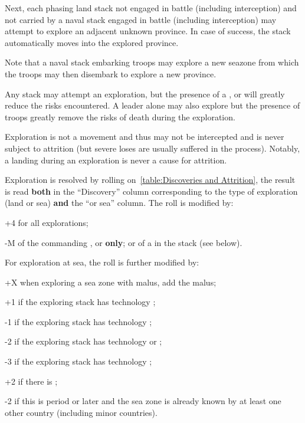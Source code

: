 Next, each phasing land stack not engaged in battle (including interception)
and not carried by a naval stack engaged in battle (including interception)
may attempt to explore an adjacent unknown province. In case of success, the
stack automatically moves into the explored province.

Note that a naval stack embarking troops may explore a new seazone from which
the troops may then disembark to explore a new province.

Any stack may attempt an exploration, but the presence of a \LeaderE, \LeaderC
or \LeaderGov will greatly reduce the risks encountered. A leader alone may
also explore but the presence of troops greatly remove the risks of death
during the exploration.

Exploration is not a movement and thus may not be intercepted and is never
subject to attrition (but severe loses are usually suffered in the
process). Notably, a landing during an exploration is never a cause for
attrition.

Exploration is resolved by rolling on~\ref{table:Discoveries and Attrition},
the result is read \textbf{both} in the ``Discovery'' column corresponding to
the type of exploration (land or sea) \textbf{and} the ``\ROTW or sea''
column. The roll is modified by:
\begin{modlist}
\item[+4] for all explorations;
\item[-M] \Man of the commanding \LeaderE, \LeaderC or \LeaderGov
  \textbf{only}; or \Man of a \LeaderMis in the stack (see below).
\end{modlist}

For exploration at sea, the roll is further modified by:
\begin{modlist}
\item[+X] when exploring a sea zone with malus, add the malus;
\item[+1] if the exploring stack has technology \TCAR;
\item[-1] if the exploring stack has technology \TBAT;
\item[-2] if the exploring stack has technology \TVE or \TTD;
\item[-3] if the exploring stack has technology \TSF;
\item[+2] if there is ;
\item[-2] if this is period  or later and the sea zone is already
  known by at least one other country (including minor countries).
\end{modlist}

